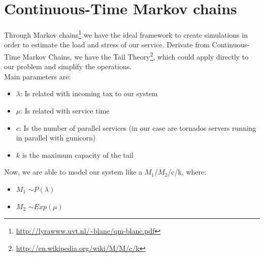 \documentclass[a4paper,11pt]{article}
\begin{document}
\section{Continuous-Time Markov chains}
Through Markov chains\footnote{\url{http://lyrawww.uvt.nl/~blanc/qm-blanc.pdf}} we have the ideal framework to create simulations in order to estimate the load and stress of our service. Derivate from Continuous-Time Markov Chains, we have the Tail Theory\footnote{\url{http://en.wikipedia.org/wiki/M/M/c/k}}, which could apply directly to our problem and simplify the operations.
\\
Main parameters are:
\begin{itemize}
\item $\lambda$: Is related with incoming tax to our system
\item $\mu$: Is related with service time
\item $c$: Is the number of parallel services (in our case are tornados servers running in parallel with gunicorn)
\item $k$ is the maximum capacity of the tail
\end{itemize}
Now, we are able to model our system like a $M_1$/$M_2$/c/k, where:
\begin{itemize}
\item $M_1$ $\sim P(\lambda)$
\item $M_2$ $\sim Exp(\mu)$
\end{itemize}
\end{document}
